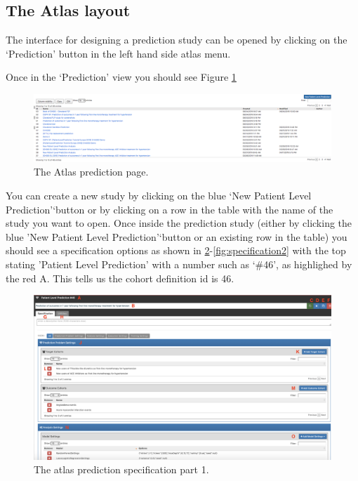 \documentclass[11pt]{book}
\begin{document}
\subsection{The Atlas layout}\label{the-atlas-layout}

The interface for designing a prediction study can be opened by clicking
on the `Prediction' button in the left hand side atlas menu.

Once in the `Prediction' view you should see Figure \ref{fig:figure2b}

\begin{figure}
\includegraphics[width=1\linewidth]{images/PatientLevelPrediction/atlasImplementation/prediction_page} \caption{The Atlas prediction page.}\label{fig:figure2b}
\end{figure}

You can create a new study by clicking on the blue `New Patient Level
Prediction'`button or by clicking on a row in the table with the name of
the study you want to open. Once inside the prediction study (either by
clicking the blue 'New Patient Level Prediction'`button or an existing
row in the table) you should see a specification options as shown in
\ref{fig:specification1}-\ref{fig:specification2} with the top stating
'Patient Level Prediction' with a number such as `\#46', as highlighed
by the red A. This tells us the cohort definition id is 46.

\begin{figure}
\includegraphics[width=1\linewidth]{images/PatientLevelPrediction/atlasImplementation/specification_p1} \caption{The atlas prediction specification part 1.}\label{fig:specification1}
\end{figure}
\end{document}
